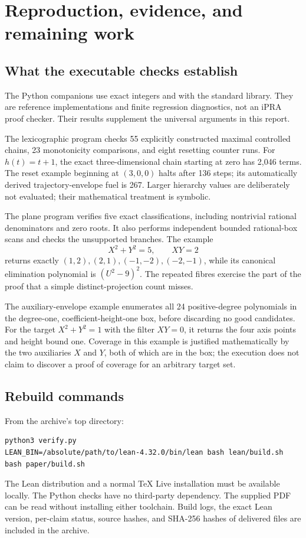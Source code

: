 \section{Reproduction, evidence, and remaining work}
\label{sec:validation}

\subsection{What the executable checks establish}

The Python companions use exact integers and 
with the standard library. They are reference implementations and
finite regression diagnostics, not an iPRA proof checker. Their results
supplement the universal arguments in this report.

The lexicographic program checks 55 explicitly constructed maximal
controlled chains, 23 monotonicity comparisons, and eight resetting
counter runs. For \(h(t)=t+1\), the exact three-dimensional chain
starting at zero has 2,046 terms. The reset example beginning at
\((3,0,0)\) halts after 136 steps; its automatically derived
trajectory-envelope fuel is 267. Larger hierarchy values are
deliberately not evaluated; their mathematical treatment is symbolic.

The plane program verifies five exact classifications, including
nontrivial rational denominators and zero roots. It also performs
independent bounded rational-box scans and checks the unsupported
branches. The example
\[
             X^2+Y^2=5,\qquad XY=2
\]
returns exactly \((1,2),(2,1),(-1,-2),(-2,-1)\), while its canonical
elimination polynomial is \((U^2-9)^2\). The repeated fibres exercise
the part of the proof that a simple distinct-projection count misses.

The auxiliary-envelope example enumerates all 24 positive-degree
polynomials in the degree-one, coefficient-height-one box, before
discarding no good candidates. For the target
\(X^2+Y^2=1\) with the filter \(XY=0\), it returns the four axis
points and height bound one. Coverage in this example is justified
mathematically by the two auxiliaries \(X\) and \(Y\), both of which
are in the box; the execution does not claim to discover a proof of
coverage for an arbitrary target set.

\subsection{Rebuild commands}

From the archive's top directory:
\begin{lstlisting}
python3 verify.py
LEAN_BIN=/absolute/path/to/lean-4.32.0/bin/lean bash lean/build.sh
bash paper/build.sh
\end{lstlisting}
The Lean distribution and a normal TeX Live installation must be
available locally. The Python checks have no third-party dependency.
The supplied PDF can be read without installing either toolchain.
Build logs, the exact Lean version, per-claim status, source hashes,
and SHA-256 hashes of delivered files are included in the archive.

